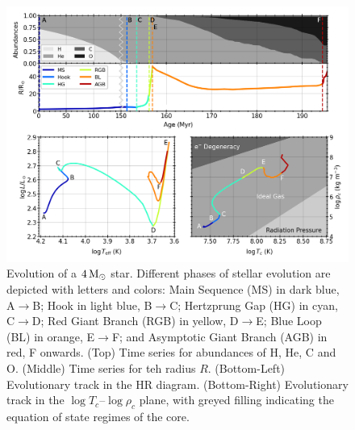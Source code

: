 \begin{figure}[!ht]
    \centering
    \includegraphics[width=1.0\textwidth]{../figures/ex4.png}  %
    \caption{\small Evolution of a $4 \, {\rm M}_\odot$ star. Different phases of stellar evolution are depicted with letters and colors: Main Sequence (MS) in dark blue, A$\rightarrow$B; Hook in light blue, B$\rightarrow$C; Hertzprung Gap (HG) in cyan, C$\rightarrow$D; Red Giant Branch (RGB) in yellow, D$\rightarrow$E; Blue Loop (BL) in orange, E$\rightarrow$F; and Asymptotic Giant Branch (AGB) in red, F onwards. (Top) Time series for abundances of H, He, C and O. (Middle) Time series for teh radius $R$. (Bottom-Left) Evolutionary track in the HR diagram. (Bottom-Right) Evolutionary track in the $\log T_c \text{--} \log \rho_c$ plane, with greyed filling indicating the equation of state regimes of the core.}
    \label{fig:ex4}
\end{figure}
